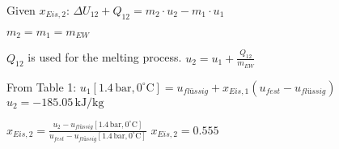 Given \( x_{Eis,2} \):  
\( \Delta U_{12} + Q_{12} = m_2 \cdot u_2 - m_1 \cdot u_1 \)  

\( m_2 = m_1 = m_{EW} \)  

\( Q_{12} \) is used for the melting process.  
\( u_2 = u_1 + \frac{Q_{12}}{m_{EW}} \)  

From Table 1:  
\( u_1 [1.4 \, \text{bar}, 0^\circ \text{C}] = u_{flüssig} + x_{Eis,1} (u_{fest} - u_{flüssig}) \)  
\( u_2 = -185.05 \, \text{kJ/kg} \)  

\( x_{Eis,2} = \frac{u_2 - u_{flüssig} [1.4 \, \text{bar}, 0^\circ \text{C}]}{u_{fest} - u_{flüssig} [1.4 \, \text{bar}, 0^\circ \text{C}]} \)  
\( x_{Eis,2} = 0.555 \)